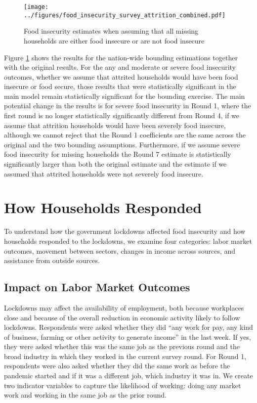 \documentclass{wber}
\begin{document}
\begin{figure}
\centering
\texttt{[image: ../figures/food\_insecurity\_survey\_attrition\_combined.pdf]}
\caption{Food insecurity estimates when assuming that all missing
households are either food insecure or are not food
insecure}\label{fig:attrition}
\end{figure}

Figure \ref{fig:attrition} shows the results for the nation-wide bounding
estimations together with the original results. For the any and moderate
or severe food insecurity outcomes, whether we assume that attrited
households would have been food insecure or food secure, those results
that were statistically significant in the main model remain
statistically significant for the bounding exercise. The main potential
change in the results is for severe food insecurity in Round 1, where
the first round is no longer statistically significantly different from
Round 4, if we assume that attrition households would have been severely
food insecure, although we cannot reject that the Round 1 coefficients
are the same across the original and the two bounding assumptions.
Furthermore, if we assume severe food insecurity for missing households
the Round 7 estimate is statistically significantly larger than both the
original estimate and the estimate if we assumed that attrited
households were not severely food insecure.

\section{How Households Responded}\label{how-households-responded}

To understand how the government lockdowns affected food insecurity and
how households responded to the lockdowns, we examine four categories:
labor market outcomes, movement between sectors, changes in income
across sources, and assistance from outside sources.

\subsection{Impact on Labor Market Outcomes}\label{impact-on-labor-market-outcomes}

Lockdowns may affect the availability of employment, both because
workplaces close and because of the overall reduction in economic
activity likely to follow lockdowns. Respondents were asked whether they
did ``any work for pay, any kind of business, farming or other activity
to generate income'' in the last week. If yes, they were asked whether
this was the same job as the previous round and the broad industry in
which they worked in the current survey round. For Round 1, respondents
were also asked whether they did the same work as before the pandemic
started and if it was a different job, which industry it was in. We
create two indicator variables to capture the likelihood of working:
doing any market work and working in the same job as the prior round.
\end{document}
